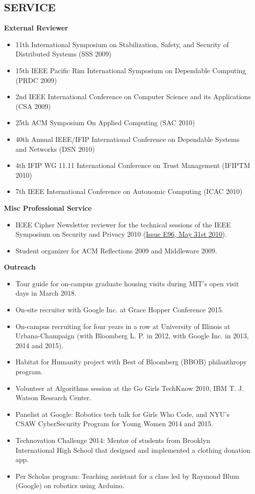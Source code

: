 \documentclass[line,margin]{res}
\begin{document}
\begin{resume}
\section{SERVICE}
  \textbf{External Reviewer}
  \begin{itemize}  \itemsep -2pt
  \item 11th International Symposium on Stabilization, Safety, and Security of Distributed Systems (SSS 2009)
  \item15th IEEE Pacific Rim International Symposium on Dependable Computing (PRDC 2009)
  \item 2nd IEEE International Conference on Computer Science and its Applications (CSA 2009)
  \item 25th ACM Symposium On Applied Computing (SAC 2010)
  \item 40th Annual IEEE/IFIP International Conference on Dependable Systems and Networks (DSN 2010)
  \item 4th IFIP WG 11.11 International Conference on Trust Management (IFIPTM 2010)
  \item 7th IEEE International Conference on Autonomic Computing (ICAC 2010)
  \end{itemize}
  \textbf{Misc Professional Service}
  \begin{itemize}  \itemsep -2pt
  \item IEEE Cipher Newsletter reviewer for the technical sessions of the IEEE Symposium on Security and Privacy 2010 (\href{http://www.ieee-security.org/Cipher/PastIssues/2010/E96.May-2010/E96.May-2010.html}{Issue E96, May 31st 2010}).
  \item Student organizer for ACM Reflections 2009 and Middleware 2009.
  \end{itemize}
  \textbf{Outreach}
  \begin{itemize}  \itemsep -2pt
  \item Tour guide for on-campus graduate housing visits during MIT's open visit days in March 2018.
  \item On-site recruiter with Google Inc. at Grace Hopper Conference 2015.
  \item On-campus recruiting for four years in a row at University of Illinois at Urbana-Champaign (with Bloomberg L. P. in 2012, with Google Inc. in 2013, 2014 and 2015).
  \item Habitat for Humanity project with Best of Bloomberg (BBOB) philanthropy program.
  \item Volunteer at Algorithms session at the Go Girls TechKnow 2010, IBM T. J. Watson Research Center.
  \item Panelist at Google: Robotics tech talk for Girls Who Code, and NYU's CSAW CyberSecurity Program for Young Women 2014 and 2015.
  \item Technovation Challenge 2014: Mentor of students from Brooklyn International High School that designed and implemented a clothing donation app.
  \item Per Scholas program: Teaching assistant for a class led by Raymond Blum (Google) on robotics using Arduino.
  \end{itemize}


\end{resume}
\end{document}
